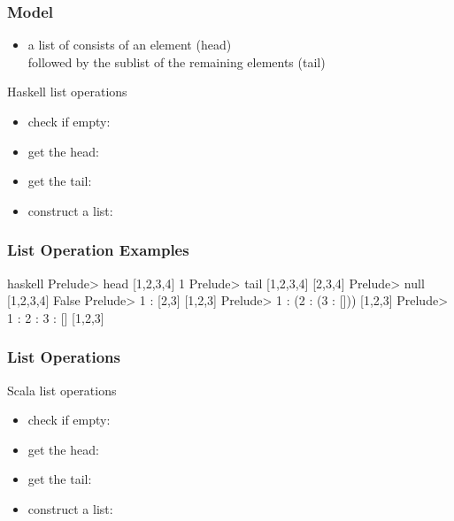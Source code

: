 \documentclass[dvipsnames]{beamer}
\theoremstyle{plain}
\begin{document}
\begin{frame}
  \frametitle{Model}

  \begin{itemize}
    \item a list of consists of an element (\alert{head})\\
      followed by the sublist of the remaining elements (\alert{tail})
  \end{itemize}

  \pause
  \medskip
  \begin{block}{Haskell list operations}
    \begin{itemize}
      \item check if empty: 
      \item get the head: 
      \item get the tail: 
      \item construct a list: 
    \end{itemize}
  \end{block}
\end{frame}

\begin{frame}[fragile]
  \frametitle{List Operation Examples}

  \begin{example}[Haskell]
    \begin{pygments}{haskell}
Prelude> head [1,2,3,4]
1
Prelude> tail [1,2,3,4]
[2,3,4]
Prelude> null [1,2,3,4]
False
Prelude> 1 : [2,3]
[1,2,3]
Prelude> 1 : (2 : (3 : []))
[1,2,3]
Prelude> 1 : 2 : 3 : []
[1,2,3]
    \end{pygments}
  \end{example}
\end{frame}

\begin{frame}
  \frametitle{List Operations}

  \begin{block}{Scala list operations}
    \begin{itemize}
      \item check if empty: 
      \item get the head: 
      \item get the tail: 
      \item construct a list: 
    \end{itemize}
  \end{block}
\end{frame}
\end{document}
